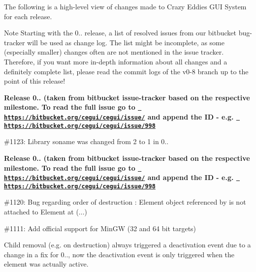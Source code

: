 The following is a high-\/level view of changes made to Crazy Eddie\textquotesingle{}s G\+UI System for each release. \begin{DoxyNote}{Note}
Starting with the 0.. release, a list of resolved issues from our bitbucket bug-\/tracker will be used as change log. The list might be incomplete, as some (especially smaller) changes often are not mentioned in the issue tracker. Therefore, if you want more in-\/depth information about all changes and a definitely complete list, please read the commit logs of the v0-\/8 branch up to the point of this release!
\end{DoxyNote}
{\bfseries{Release 0.. (taken from bitbucket issue-\/tracker based on the respective milestone. To read the full issue go to \href{https://bitbucket.org/cegui/cegui/issue/}{\texttt{ https\+://bitbucket.\+org/cegui/cegui/issue/}} and append the ID -\/ e.\+g. \href{https://bitbucket.org/cegui/cegui/issue/998}{\texttt{ https\+://bitbucket.\+org/cegui/cegui/issue/998}} }}
\begin{DoxyItemize}
\item \#1123\+: Library soname was changed from 2 to 1 in 0..
\end{DoxyItemize}

{\bfseries{Release 0.. (taken from bitbucket issue-\/tracker based on the respective milestone. To read the full issue go to \href{https://bitbucket.org/cegui/cegui/issue/}{\texttt{ https\+://bitbucket.\+org/cegui/cegui/issue/}} and append the ID -\/ e.\+g. \href{https://bitbucket.org/cegui/cegui/issue/998}{\texttt{ https\+://bitbucket.\+org/cegui/cegui/issue/998}} }}
\begin{DoxyItemize}
\item \#1120\+: Bug regarding order of destruction \+: Element object referenced by \textquotesingle{} is not attached to Element at (...)
\item \#1111\+: Add official support for Min\+GW (32 and 64 bit targets)
\item Child removal (e.\+g. on destruction) always triggered a deactivation event due to a change in a fix for 0.., now the deactivation event is only triggered when the element was actually active.
\end{DoxyItemize}

